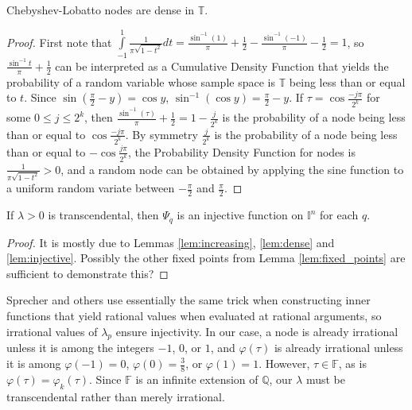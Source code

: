 \begin{lemma}
  \label{lem:dense}
  Chebyshev-Lobatto nodes are dense in $\mathbb{T}$.
\end{lemma}
\begin{proof}
  First note that $\int\limits_{-1}^1 \frac{1}{\pi \sqrt{1 - t^2}} dt = \frac{\sin^{-1}\left(1\right)}{\pi} + \frac{1}{2} - \frac{\sin^{-1}\left(-1\right)}{\pi} - \frac{1}{2} = 1$, so $\frac{\sin^{-1} t}{\pi} + \frac{1}{2}$ can be interpreted as a Cumulative Density Function that yields the probability of a random variable whose sample space is $\mathbb{T}$ being less than or equal to $t$. Since $\sin\left(\frac{\pi}{2} - y\right) = \cos y$, $\sin^{-1}\left(\cos y\right) = \frac{\pi}{2} - y$. If $\tau = \cos \frac{-j\pi}{2^k}$ for some $0 \leq j \leq 2^k$, then $\frac{\sin^{-1}\left(\tau\right)}{\pi} + \frac{1}{2} = 1 - \frac{j}{2^k}$ is the probability of a node being less than or equal to $\cos\frac{-j\pi}{2^k}$. By symmetry $\frac{j}{2^k}$ is the probability of a node being less than or equal to $-\cos \frac{j\pi}{2^k}$, the Probability Density Function for nodes is $\frac{1}{\pi \sqrt{1 - t^2}} > 0$, and a random node can be obtained by applying the sine function to a uniform random variate between $-\frac{\pi}{2}$ and $\frac{\pi}{2}$.
\end{proof}


\begin{proposition}
  \label{prop:injective}
  If $\lambda > 0$ is transcendental, then $\Psi_q$ is an injective function on $\mathbb{I}^n$ for each $q$.
\end{proposition}
\begin{proof}
  It is mostly due to Lemmas \ref{lem:increasing}, \ref{lem:dense} and \ref{lem:injective}. Possibly the other fixed points from Lemma \ref{lem:fixed_points} are sufficient to demonstrate this?
\end{proof}

\begin{remark*}
Sprecher and others use essentially the same trick when constructing inner functions that yield rational values when evaluated at rational arguments, so irrational values of $\lambda_p$ ensure injectivity. In our case, a node is already irrational unless it is among the integers $-1$, $0$, or $1$, and $\varphi\left(\tau\right)$ is already irrational unless it is among $\varphi\left(-1\right) = 0$, $\varphi\left(0\right) = \frac{3}{8}$, or $\varphi\left(1\right) = 1$. However, $\tau \in \mathbb{F}$, as is $\varphi\left(\tau\right) = \varphi_k\left(\tau\right)$. Since $\mathbb{F}$ is an infinite extension of $\mathbb{Q}$, our $\lambda$ must be transcendental rather than merely irrational.
\end{remark*}


